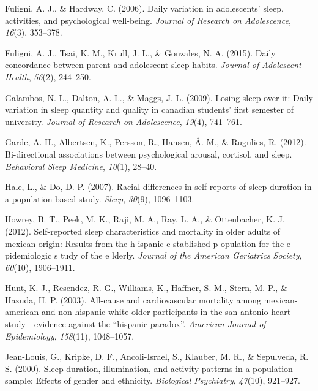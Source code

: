 \documentclass[
  man, fleqn, noextraspace]{apa6}
\begin{document}
\leavevmode\hypertarget{ref-fuligni2006daily}{}%
Fuligni, A. J., \& Hardway, C. (2006). Daily variation in adolescents' sleep, activities, and psychological well-being. \emph{Journal of Research on Adolescence}, \emph{16}(3), 353--378.

\leavevmode\hypertarget{ref-fuligni2015daily}{}%
Fuligni, A. J., Tsai, K. M., Krull, J. L., \& Gonzales, N. A. (2015). Daily concordance between parent and adolescent sleep habits. \emph{Journal of Adolescent Health}, \emph{56}(2), 244--250.

\leavevmode\hypertarget{ref-galambos2009losing}{}%
Galambos, N. L., Dalton, A. L., \& Maggs, J. L. (2009). Losing sleep over it: Daily variation in sleep quantity and quality in canadian students' first semester of university. \emph{Journal of Research on Adolescence}, \emph{19}(4), 741--761.

\leavevmode\hypertarget{ref-garde_2012_bi}{}%
Garde, A. H., Albertsen, K., Persson, R., Hansen, Å. M., \& Rugulies, R. (2012). Bi-directional associations between psychological arousal, cortisol, and sleep. \emph{Behavioral Sleep Medicine}, \emph{10}(1), 28--40.

\leavevmode\hypertarget{ref-hale2007racial}{}%
Hale, L., \& Do, D. P. (2007). Racial differences in self-reports of sleep duration in a population-based study. \emph{Sleep}, \emph{30}(9), 1096--1103.

\leavevmode\hypertarget{ref-howrey2012self}{}%
Howrey, B. T., Peek, M. K., Raji, M. A., Ray, L. A., \& Ottenbacher, K. J. (2012). Self-reported sleep characteristics and mortality in older adults of mexican origin: Results from the h ispanic e stablished p opulation for the e pidemiologic s tudy of the e lderly. \emph{Journal of the American Geriatrics Society}, \emph{60}(10), 1906--1911.

\leavevmode\hypertarget{ref-hunt2003all}{}%
Hunt, K. J., Resendez, R. G., Williams, K., Haffner, S. M., Stern, M. P., \& Hazuda, H. P. (2003). All-cause and cardiovascular mortality among mexican-american and non-hispanic white older participants in the san antonio heart study---evidence against the ``hispanic paradox''. \emph{American Journal of Epidemiology}, \emph{158}(11), 1048--1057.

\leavevmode\hypertarget{ref-jean2000sleep}{}%
Jean-Louis, G., Kripke, D. F., Ancoli-Israel, S., Klauber, M. R., \& Sepulveda, R. S. (2000). Sleep duration, illumination, and activity patterns in a population sample: Effects of gender and ethnicity. \emph{Biological Psychiatry}, \emph{47}(10), 921--927.
\end{document}
